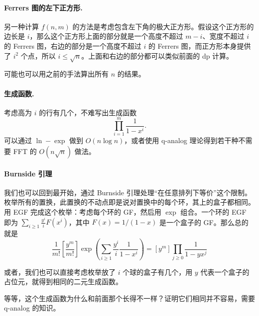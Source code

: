         \paragraph{Ferrers 图的左下正方形.} 
    另一种计算 $f(n,m)$ 的方法是考虑包含左下角的极大正方形。假设这个正方形的边长是 $i$，那么这个正方形上面的部分就是一个高度不超过 $m-i$、宽度不超过 $i$ 的 Ferrers 图，右边的部分是一个高度不超过 $i$ 的 Ferrers 图，而正方形本身提供了 $i^2$ 个点，所以 $i\le \sqrt{n}$。上面和右边的部分都可以类似前面的 dp 计算。

    可能也可以用之前的手法算出所有 $n$ 的结果。

    \paragraph{生成函数.}
    考虑高为 $i$ 的行有几个，不难写出生成函数
    $$
    \prod_{i=1}^m\frac{1}{1-x^i}.
    $$
    可以通过 $\ln-\exp$ 做到 $O(n\log n)$，或者使用 q-analog 理论得到若干种不需要 FFT 的 $O(n\sqrt{n})$ 做法。

    \paragraph{Burnside 引理}
    我们也可以回到最开始，通过 Burnside 引理处理“在任意排列下等价”这个限制。枚举所有的置换，此置换的不动点即是说对置换中的每个环，其上的盒子都相同。用 EGF 完成这个枚举：考虑每个环的 GF，然后用 $\exp$ 组合。一个环的 EGF 即为 $\sum_{i\ge 1}\frac{y^i}{i}F(x^i)$，其中 $F(x)=1/(1-x)$ 是一个盒子的 GF。那么总的就是
    $$
    \frac{1}{m!}\left[\frac{y^m}{m!}\right]\exp\left(\sum_{i\ge 1}\frac{y^i}{i}\frac{1}{1-x^i}\right)=[y^m]\prod_{j\ge 0}\frac{1}{1-yx^j}
    $$

    或者，我们也可以直接考虑枚举放了 $i$ 个球的盒子有几个，用 $y$ 代表一个盒子的占位元，就得到相同的二元生成函数。

    等等，这个生成函数为什么和前面那个长得不一样？证明它们相同并不容易，需要 q-analog 的知识。

